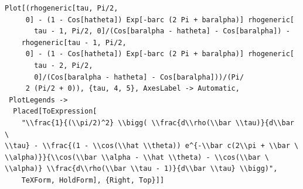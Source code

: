 \documentclass[reqno]{amsart}
\theoremstyle{definition} \newtheorem{definition}{Definition}[section]
\theoremstyle{definition} \newtheorem{remark}[definition]{Remark}
\theoremstyle{plain} \newtheorem{lemma}[definition]{Lemma}
\theoremstyle{plain} \newtheorem{proposition}[definition]{Proposition}
\theoremstyle{plain} \newtheorem{theorem}[definition]{Theorem}
\theoremstyle{plain} \newtheorem{corollary}[definition]{Corollary}
\theoremstyle{definition} \newtheorem{example}[definition]{Example}
\theoremstyle{plain} \newtheorem{claim}[clai]{Claim}
\theoremstyle{definition} \newtheorem{assumption}[definition]{Assumption}
\theoremstyle{definition} \newtheorem{observation}[definition]{Observation}
\newcommand{\1}{\mathbbm 1}
\numberwithin{equation}{section} %
\theoremstyle{plain} \newtheorem*{theorem*}{Theorem}
\theoremstyle{plain} \newtheorem{mthm}[maintheorem]{Main Theorem}
\theoremstyle{plain} \newtheorem*{mthm*}{Main Theorem}
\theoremstyle{plain} \newtheorem*{conjecture*}{Conjecture}
\theoremstyle{plain} \newtheorem{conjecture}[definition]{Conjecture}
\theoremstyle{plain} \newtheorem*{problem*}{Problem}
\begin{document}
\begin{verbatim}
Plot[(rhogeneric[tau, Pi/2, 
     0] - (1 - Cos[hatheta]) Exp[-barc (2 Pi + baralpha)] rhogeneric[
       tau - 1, Pi/2, 0]/(Cos[baralpha - hatheta] - Cos[baralpha]) - 
    rhogeneric[tau - 1, Pi/2, 
     0] - (1 - Cos[hatheta]) Exp[-barc (2 Pi + baralpha)] rhogeneric[
       tau - 2, Pi/2, 
       0]/(Cos[baralpha - hatheta] - Cos[baralpha]))/(Pi/
     2 (Pi/2 + 0)), {tau, 4, 5}, AxesLabel -> Automatic, 
 PlotLegends -> 
  Placed[ToExpression[
    "\\frac{1}{(\\pi/2)^2} \\bigg( \\frac{d\\rho(\\bar \\tau)}{d\\bar \
\\tau} - \\frac{(1 - \\cos(\\hat \\theta)) e^{-\\bar c(2\\pi + \\bar \
\\alpha)}}{\\cos(\\bar \\alpha - \\hat \\theta) - \\cos(\\bar \
\\alpha)} \\frac{d\\rho(\\bar \\tau - 1)}{d\\bar \\tau} \\bigg)", 
    TeXForm, HoldForm], {Right, Top}]]
\end{verbatim}










\newpage

\printglossaries

\newpage





\end{document}
